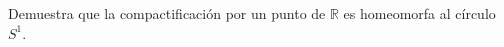 \item Demuestra que la compactificación por un punto de $\mathbb{R}$ es homeomorfa al círculo $S^1$.